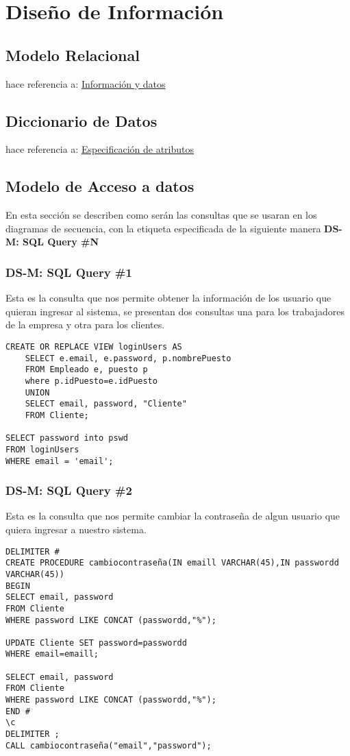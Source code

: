 \chapter{Diseño de Información}
\label{cap:DiseniodeInformacion}
\section{Modelo Relacional}
hace referencia a:
\hyperlink{cap:infoydats}{Información y datos}
\section{Diccionario de Datos}
hace referencia a:
\hyperlink{cap:metadatos}{Especificación de atributos}
\section{Modelo de Acceso a datos}
En esta sección se describen como serán las consultas que se usaran en los diagramas de secuencia, con la etiqueta especificada de la siguiente manera \textbf{DS-M: SQL Query
\#N}
\subsection{DS-M: SQL Query \#1}
Esta es la consulta que nos permite obtener la información de los usuario que quieran ingresar al sistema, se presentan dos consultas una para los trabajadores de la empresa y otra para los clientes.    
\begin{verbatim}
CREATE OR REPLACE VIEW loginUsers AS
    SELECT e.email, e.password, p.nombrePuesto
    FROM Empleado e, puesto p
    where p.idPuesto=e.idPuesto
    UNION
    SELECT email, password, "Cliente"
    FROM Cliente;
    
SELECT password into pswd
FROM loginUsers
WHERE email = 'email';
\end{verbatim}


\subsection{DS-M: SQL Query \#2}
Esta es la consulta que nos permite cambiar la contraseña de algun usuario que quiera ingresar a nuestro sistema.
\begin{verbatim}
DELIMITER #
CREATE PROCEDURE cambiocontraseña(IN emaill VARCHAR(45),IN passwordd VARCHAR(45))
BEGIN
SELECT email, password
FROM Cliente
WHERE password LIKE CONCAT (passwordd,"%");
	
UPDATE Cliente SET password=passwordd
WHERE email=emaill;
	
SELECT email, password
FROM Cliente
WHERE password LIKE CONCAT (passwordd,"%");
END #
\c 
DELIMITER ;
CALL cambiocontraseña("email","password");
\end{verbatim}


